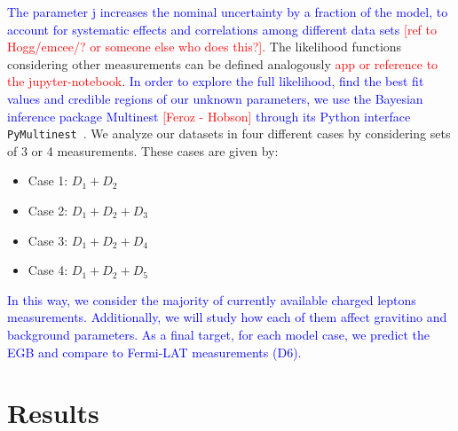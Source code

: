\documentclass[a4paper,11pt]{article}
\newcommand*{\blue}{\textcolor{blue}}
\newcommand*{\red}{\textcolor{red}}
\begin{document}
\blue{The parameter j increases the nominal uncertainty by a fraction of the model, to account for systematic effects and correlations among different data sets} \red{[ref to Hogg/emcee/? or someone else who does this?].} The likelihood functions considering other measurements can be defined analogously \red{app or reference to the jupyter-notebook}. \blue{In order to explore the full likelihood, find the best fit values and credible regions of our unknown parameters, we use the Bayesian inference package Multinest \red{[Feroz - Hobson]} through its Python interface} \verb|PyMultinest|~\cite{Buchner:2014nha}. We analyze our datasets in four different cases by considering sets of 3 or 4 measurements. These cases are given by:



\begin{itemize}
\item Case 1: $D_1 + D_2$
\item Case 2: $D_1 + D_2 + D_3$
\item Case 3: $D_1 + D_2 + D_4$
\item Case 4: $D_1 + D_2 + D_5$
\end{itemize}

\blue{In this way, we consider the majority of currently available charged leptons measurements. Additionally, we will study how each of them affect gravitino and background parameters. As a final target, for each model case, we predict the EGB and compare to Fermi-LAT measurements (D6).} 




\section{Results}
\label{sec:results}
\end{document}
